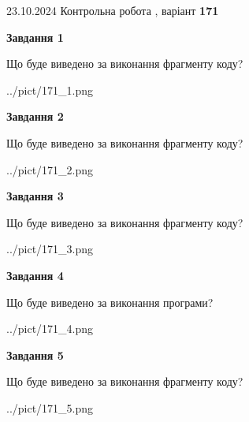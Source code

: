 \documentclass[12pt, ukrainian]{article}
\begin{document}
{\Large{23.10.2024 Контрольна робота , варіант  \No \textbf { 171 }\par}}
{
\begin {large}
{\begin {center}\textbf{Завдання 1}\end {center}}

Що буде виведено за виконання фрагменту коду?\par
\begin{center}
	{../pict/171_1.png}
\end{center}
\newpage

{\begin {center}\textbf{Завдання 2}\end {center}}

Що буде виведено за виконання фрагменту коду?\par
\begin{center}
	{../pict/171_2.png}
\end{center}
\newpage

{\begin {center}\textbf{Завдання 3}\end {center}}

Що буде виведено за виконання фрагменту коду?\par
\begin{center}
	{../pict/171_3.png}
\end{center}
\newpage

{\begin {center}\textbf{Завдання 4}\end {center}}

Що буде виведено за виконання програми?\par
\begin{center}
	{../pict/171_4.png}
\end{center}
\newpage

{\begin {center}\textbf{Завдання 5}\end {center}}

Що буде виведено за виконання фрагменту коду?\par
\begin{center}
	{../pict/171_5.png}
\end{center}
\newpage


\end{large}}
\end{document}
